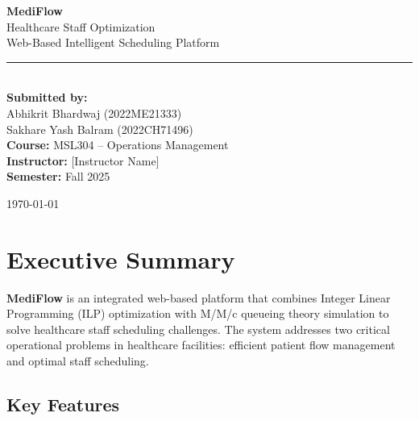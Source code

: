 \documentclass[12pt,a4paper]{article}
\begin{document}
\begin{titlepage}
\begin{center}
    \vspace*{2cm}
    {\Huge\bfseries\color{accent} MediFlow}\\[0.5cm]
    {\LARGE Healthcare Staff Optimization}\\[0.3cm]
    {\Large Web-Based Intelligent Scheduling Platform}\\[1.5cm]
    \rule{0.7\textwidth}{0.5pt}\\[2cm]
    
    {\large\bfseries Submitted by:}\\[0.8cm]
    {\large
    Abhikrit Bhardwaj (2022ME21333)\\
    Sakhare Yash Balram (2022CH71496)
    }\\[2.5cm]
    
    {\large
    \textbf{Course:} MSL304 -- Operations Management\\[0.3cm]
    \textbf{Instructor:} [Instructor Name]\\[0.3cm]
    \textbf{Semester:} Fall 2025\\[0.5cm]
    }
    
    \vfill
    {\large \today}
\end{center}
\end{titlepage}

\tableofcontents
\newpage

\section{Executive Summary}
\label{sec:executive}

\noindent\textbf{MediFlow} is an integrated web-based platform that combines Integer Linear Programming (ILP) optimization with M/M/c queueing theory simulation to solve healthcare staff scheduling challenges. The system addresses two critical operational problems in healthcare facilities: efficient patient flow management and optimal staff scheduling.

\vspace{0.5em}

\subsection{Key Features}
\end{document}
